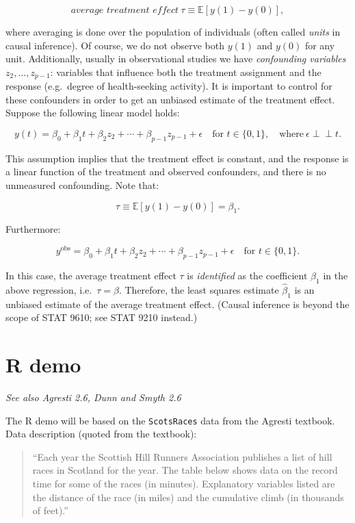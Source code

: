 \documentclass[
  11pt,
  letterpaper,
  oneside]{book}
\theoremstyle{definition}
\theoremstyle{plain}
\theoremstyle{plain}
\theoremstyle{plain}
\theoremstyle{remark}
\begin{document}
\[
\textit{average treatment effect} \  \tau \equiv \mathbb{E}[y(1) - y(0)],
\]

where averaging is done over the population of individuals (often called
\emph{units} in causal inference). Of course, we do not observe both
\(y(1)\) and \(y(0)\) for any unit. Additionally, usually in
observational studies we have \emph{confounding variables}
\(z_2, \dots, z_{p-1}\): variables that influence both the treatment
assignment and the response (e.g.~degree of health-seeking activity). It
is important to control for these confounders in order to get an
unbiased estimate of the treatment effect. Suppose the following linear
model holds:

\[
y(t) = \beta_0 + \beta_1 t + \beta_2 z_2 + \cdots + \beta_{p-1} z_{p-1} + \epsilon \quad \text{for } t \in \{0, 1\}, \quad \text{where} \ \epsilon \perp\!\!\!\!\perp t.
\]

This assumption implies that the treatment effect is constant, and the
response is a linear function of the treatment and observed confounders,
and there is no unmeasured confounding. Note that:

\[
\tau \equiv \mathbb{E}[y(1) - y(0)] = \beta_1.
\]

Furthermore:

\[
y^{\text{obs}} = \beta_0 + \beta_1 t + \beta_2 z_2 + \cdots + \beta_{p-1} z_{p-1} + \epsilon \quad \text{for } t \in \{0, 1\}.
\]

In this case, the average treatment effect \(\tau\) is \emph{identified}
as the coefficient \(\beta_1\) in the above regression,
i.e.~\(\tau = \beta\). Therefore, the least squares estimate
\(\widehat{\beta}_1\) is an unbiased estimate of the average treatment
effect. (Causal inference is beyond the scope of STAT 9610; see STAT
9210 instead.)

\hypertarget{sec-r-demo-part-1}{%
\chapter{R demo}\label{sec-r-demo-part-1}}

\emph{See also Agresti 2.6, Dunn and Smyth 2.6}

The R demo will be based on the \texttt{ScotsRaces} data from the
Agresti textbook. Data description (quoted from the textbook):

\begin{quote}
``Each year the Scottish Hill Runners Association publishes a list of
hill races in Scotland for the year. The table below shows data on the
record time for some of the races (in minutes). Explanatory variables
listed are the distance of the race (in miles) and the cumulative climb
(in thousands of feet).''
\end{quote}
\end{document}
